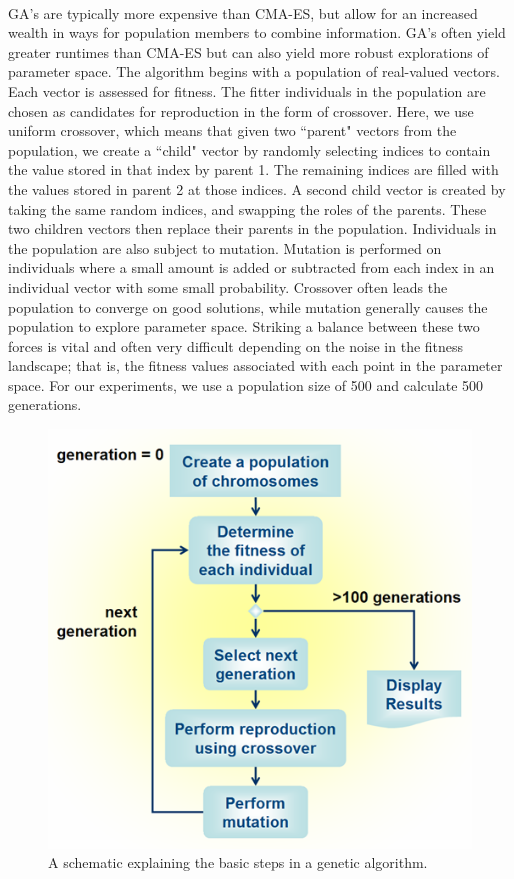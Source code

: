 \\
GA's are typically more expensive than CMA-ES, but allow for an increased wealth in ways for population members to combine information. GA's often yield greater runtimes than CMA-ES but can also yield more robust explorations of parameter space. The algorithm begins with a population of real-valued vectors. Each vector is assessed for fitness. The fitter individuals in the population are chosen as candidates for reproduction in the form of crossover. Here, we use uniform crossover, which means that given two ``parent" vectors from the population, we create a ``child" vector by randomly selecting indices to contain the value stored in that index by parent 1. The remaining indices are filled with the values stored in parent 2 at those indices. A second child vector is created by taking the same random indices, and swapping the roles of the parents. These two children vectors then replace their parents in the population. Individuals in the population are also subject to mutation. Mutation is performed on individuals where a small amount is added or subtracted from each index in an individual vector with some small probability. Crossover often leads the population to converge on good solutions, while mutation generally causes the population to explore parameter space. Striking a balance between these two forces is vital and often very difficult depending on the noise in the fitness landscape; that is, the fitness values associated with each point in the parameter space. For our experiments, we use a population size of 500 and calculate 500 generations.

\begin{figure}[tpb!]
\centering
  \includegraphics[width=.48\textwidth]{figures/gaImg.png}
  \caption{
      A schematic explaining the basic steps in a genetic algorithm.
    }
  \label{fig:ga}
\end{figure}

